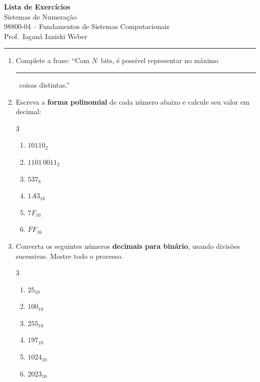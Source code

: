 \documentclass[11pt, a4paper]{article}
\begin{document}
\begin{center}
  {\LARGE \textbf{Lista de Exerc\'{i}cios}}\\[4pt]
  {\Large Sistemas de Numera\c{c}\~{a}o}\\[6pt]
  {\large 98800-04 -- Fundamentos de Sistemas Computacionais}\\[3pt]
  {\normalsize Prof.\ Ia\c{c}an\~{a} Ianiski Weber}
\end{center}

\vspace{2pt}
\hrule
\vspace{8pt}

\begin{enumerate}

\item Complete a frase: ``Com $N$~bits, \'{e} poss\'{i}vel representar no m\'{a}ximo \rule{2cm}{0.4pt}~coisas distintas.''
\item Escreva a \textbf{forma polinomial} de cada n\'{u}mero abaixo e calcule seu valor em decimal:
\begin{multicols}{3}
\begin{enumerate}
  \item $10110_2$
  \item $1101\,0011_2$
  \item $537_8$
  \item $1A3_{16}$
  \item $7F_{16}$
  \item $FF_{16}$
\end{enumerate}
\end{multicols}

\item Converta os seguintes n\'{u}meros \textbf{decimais para bin\'{a}rio}, usando divis\~{o}es sucessivas. Mostre todo o processo.
\begin{multicols}{3}
\begin{enumerate}
  \item $25_{10}$
  \item $100_{10}$
  \item $255_{10}$
  \item $197_{10}$
  \item $1024_{10}$
  \item $2023_{10}$
\end{enumerate}
\end{multicols}


\end{enumerate}
\end{document}
